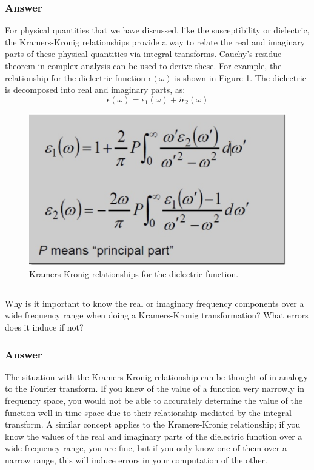 \documentclass[12pt]{article}
\begin{document}
\subsubsection{Answer}
For physical quantities that we have discussed, like the susceptibility or dielectric, the Kramers-Kronig relationships provide a way to relate the real and imaginary parts of these physical quantities via integral transforms. Cauchy's residue theorem in complex analysis can be used to derive these. For example, the relationship for the dielectric function $\epsilon(\omega)$ is shown in Figure \ref{fig:kk}. The dielectric is decomposed into real and imaginary parts, as:
\begin{equation}
  \epsilon(\omega)=\epsilon_{1}(\omega)+i \epsilon_{2}(\omega)
\end{equation}
\begin{figure}
  \centering
  \includegraphics[width=\textwidth]{kk.png}
  \caption{Kramers-Kronig relationships for the dielectric function.}
  \label{fig:kk}
\end{figure}
\subsection{}
Why is it important to know the real or imaginary frequency components over a wide frequency range when doing a Kramers-Kronig transformation? What errors does it induce if not?
\subsubsection{Answer}
The situation with the Kramers-Kronig relationship can be thought of in analogy to the Fourier transform. If you knew of the value of a function very narrowly in frequency space, you would not be able to accurately determine the value of the function well in time space due to their relationship mediated by the integral transform. A similar concept applies to the Kramers-Kronig relationship; if you know the values of the real and imaginary parts of the dielectric function over a wide frequency range, you are fine, but if you only know one of them over a narrow range, this will induce errors in your computation of the other.
\end{document}
